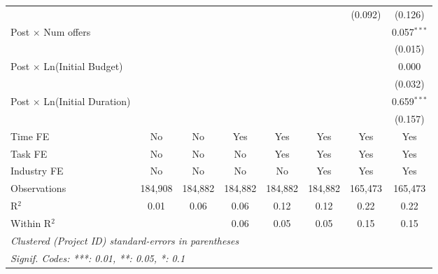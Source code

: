 \documentclass[
]{article}
\begin{document}
\begin{tabular}{lccccccc}
                                                           &                &                &                &               &                & (0.092)        & (0.126)\\   
   Post $\times$ Num offers                                &                &                &                &               &                &                & 0.057$^{***}$\\   
                                                           &                &                &                &               &                &                & (0.015)\\   
   Post $\times$ Ln(Initial Budget)                        &                &                &                &               &                &                & 0.000\\   
                                                           &                &                &                &               &                &                & (0.032)\\   
   Post $\times$ Ln(Initial Duration)                      &                &                &                &               &                &                & 0.659$^{***}$\\   
                                                           &                &                &                &               &                &                & (0.157)\\   
   Time FE                                                 & No             & No             & Yes            & Yes           & Yes            & Yes            & Yes\\  
   Task FE                                                 & No             & No             & No             & Yes           & Yes            & Yes            & Yes\\  
   Industry FE                                             & No             & No             & No             & No            & Yes            & Yes            & Yes\\  
   Observations                                            & 184,908        & 184,882        & 184,882        & 184,882       & 184,882        & 165,473        & 165,473\\  
   R$^2$                                                   & 0.01           & 0.06           & 0.06           & 0.12          & 0.12           & 0.22           & 0.22\\  
   Within R$^2$                                            &                &                & 0.06           & 0.05          & 0.05           & 0.15           & 0.15\\  
   \midrule
   \multicolumn{8}{l}{\emph{Clustered (Project ID) standard-errors in parentheses}}\\
   \multicolumn{8}{l}{\emph{Signif. Codes: ***: 0.01, **: 0.05, *: 0.1}}\\
\end{tabular}
\end{document}
